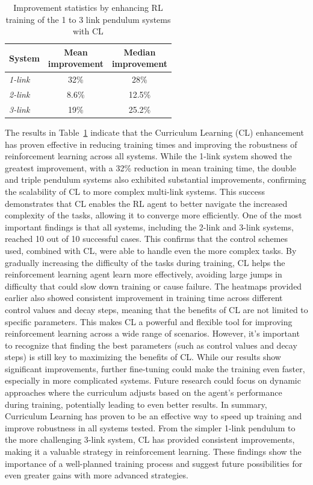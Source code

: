 \begin{table}[ht]
	\centering
	\caption{Improvement statistics by enhancing RL training of the 1 to 3 link pendulum systems with CL}
	\begin{tabular}{@{}lcc@{}}
		\toprule
		\textbf{System} & \makecell{\textbf{Mean}\\ \textbf{improvement}} & \makecell{\textbf{Median}\\ \textbf{improvement}} \\ \midrule
		\textit{1-link} & 32\% & 28\% \\
		\textit{2-link} & 8.6\% & 12.5\% \\
		\textit{3-link} & 19\% & 25.2\% \\ \bottomrule
	\end{tabular}
	\label{tab: CL improvement statistics}
\end{table}

The results in Table~\ref{tab: CL improvement statistics} indicate that the Curriculum Learning (CL) enhancement has proven effective in reducing training times and improving the robustness of reinforcement learning across all systems. While the 1-link system showed the greatest improvement, with a 32\% reduction in mean training time, the double and triple pendulum systems also exhibited substantial improvements, confirming the scalability of CL to more complex multi-link systems. This success demonstrates that CL enables the RL agent to better navigate the increased complexity of the tasks, allowing it to converge more efficiently. 
One of the most important findings is that all systems, including the 2-link and 3-link systems, reached 10 out of 10 successful cases. This confirms that the control schemes used, combined with CL, were able to handle even the more complex tasks. By gradually increasing the difficulty of the tasks during training, CL helps the reinforcement learning agent learn more effectively, avoiding large jumps in difficulty that could slow down training or cause failure. The heatmaps provided earlier also showed consistent improvement in training time across different control values and decay steps, meaning that the benefits of CL are not limited to specific parameters. This makes CL a powerful and flexible tool for improving reinforcement learning across a wide range of scenarios. However, it’s important to recognize that finding the best parameters (such as control values and decay steps) is still key to maximizing the benefits of CL. While our results show significant improvements, further fine-tuning could make the training even faster, especially in more complicated systems. Future research could focus on dynamic approaches where the curriculum adjusts based on the agent's performance during training, potentially leading to even better results.
In summary, Curriculum Learning has proven to be an effective way to speed up training and improve robustness in all systems tested. From the simpler 1-link pendulum to the more challenging 3-link system, CL has provided consistent improvements, making it a valuable strategy in reinforcement learning. These findings show the importance of a well-planned training process and suggest future possibilities for even greater gains with more advanced strategies.